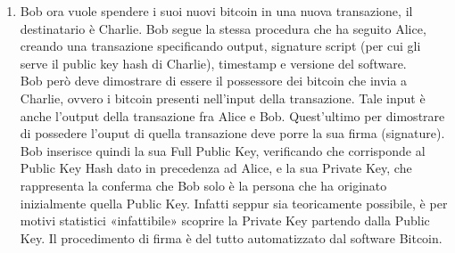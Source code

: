 \begin{enumerate}
\item Bob ora vuole spendere i suoi nuovi bitcoin in una nuova transazione, il destinatario è Charlie. Bob segue la stessa procedura che ha seguito Alice, creando una transazione specificando output, signature script (per cui gli serve il public key hash di Charlie), timestamp e versione del software.
\\Bob però deve dimostrare di essere il possessore dei bitcoin che invia a Charlie, ovvero i bitcoin presenti nell’input della transazione. Tale input è anche l’output della transazione fra Alice e Bob. Quest’ultimo per dimostrare di possedere l’ouput di quella transazione deve porre la sua firma (signature). Bob inserisce quindi la sua Full Public Key, verificando che corrisponde al Public Key Hash dato in precedenza ad Alice, e la sua Private Key, che rappresenta la conferma che Bob solo è la persona che ha originato inizialmente quella Public Key. Infatti seppur sia teoricamente possibile, è per motivi statistici «infattibile» scoprire la Private Key partendo dalla Public Key. Il procedimento di firma è del tutto automatizzato dal software Bitcoin\cite{transazioneBitcoin}.

\end{enumerate}
